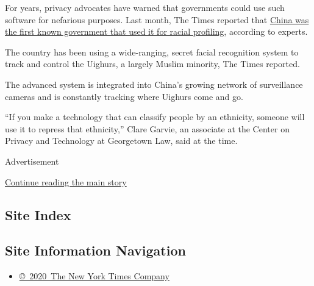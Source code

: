 For years, privacy advocates have warned that governments could use such
software for nefarious purposes. Last month, The Times reported that
\href{https://www.nytimes3xbfgragh.onion/2019/04/14/technology/china-surveillance-artificial-intelligence-racial-profiling.html}{China
was the first known government that used it for racial profiling},
according to experts.

The country has been using a wide-ranging, secret facial recognition
system to track and control the Uighurs, a largely Muslim minority, The
Times reported.

The advanced system is integrated into China's growing network of
surveillance cameras and is constantly tracking where Uighurs come and
go.

``If you make a technology that can classify people by an ethnicity,
someone will use it to repress that ethnicity,'' Clare Garvie, an
associate at the Center on Privacy and Technology at Georgetown Law,
said at the time.

Advertisement

\protect\hyperlink{after-bottom}{Continue reading the main story}

\hypertarget{site-index}{%
\subsection{Site Index}\label{site-index}}

\hypertarget{site-information-navigation}{%
\subsection{Site Information
Navigation}\label{site-information-navigation}}

\begin{itemize}
\tightlist
\item
  \href{https://help.nytimes3xbfgragh.onion/hc/en-us/articles/115014792127-Copyright-notice}{©~2020~The
  New York Times Company}
\end{itemize}

